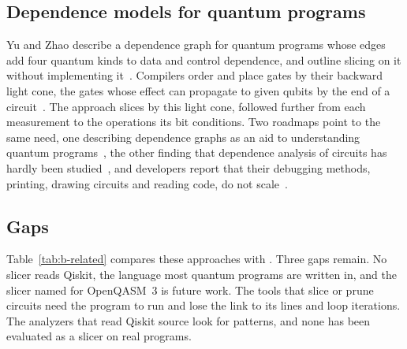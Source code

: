 \subsection{Dependence models for quantum programs}
Yu and Zhao describe a dependence graph for quantum programs whose edges add four quantum kinds to data and control
dependence, and outline slicing on it without implementing it~\cite{yu2025qpdg}. Compilers order and place gates by their backward light cone, the gates whose effect can propagate to given qubits by
the end of a circuit~\cite{murali2019triq, amy2020staq}. The approach slices by this light cone, followed further from each
measurement to the operations its bit conditions. Two roadmaps point to the same need, one describing dependence graphs
as an aid to understanding quantum programs~\cite{murillo2025roadmap}, the other finding that dependence analysis of
circuits has hardly been studied~\cite{ramalho2025road}, and developers report that their debugging methods, printing, drawing circuits and reading code, do not
scale~\cite{zappin2026challenges}.

\subsection{Gaps}
Table~\ref{tab:b-related} compares these approaches with \tool{}. Three gaps remain. No slicer reads Qiskit, the
language most quantum programs are written in, and the slicer named for OpenQASM~3 is future work. The tools that
slice or prune circuits need the program to run and lose the link to its lines and loop iterations. The analyzers that
read Qiskit source look for patterns, and none has been evaluated as a slicer on real programs.

